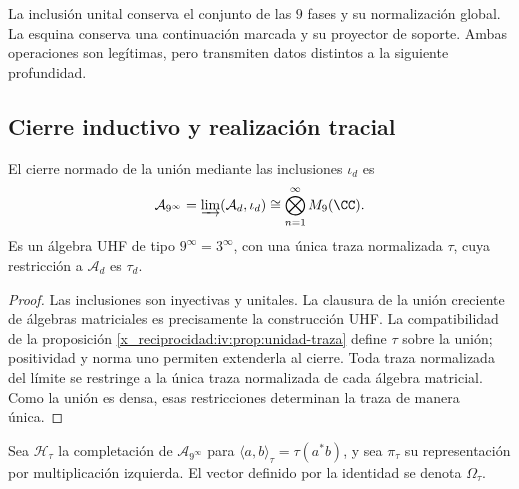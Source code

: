 La inclusión unital conserva el conjunto de las \(9\) fases y su
normalización global. La esquina conserva una continuación marcada y
su proyector de soporte. Ambas operaciones son legítimas, pero
transmiten datos distintos a la siguiente profundidad.

\subsection{Cierre inductivo y realización tracial}

\begin{theorem}
\label{x_reciprocidad:iv:thm:uhf}
El cierre normado de la unión mediante las inclusiones \(\iota_d\)
es
\[
 \mathcal A_{9^\infty}
 =\varinjlim(\mathcal A_d,\iota_d)
 \cong\bigotimes_{n=1}^{\infty}M_9(\CC).
\]
Es un álgebra UHF de tipo \(9^\infty=3^\infty\), con una única
traza normalizada \(\tau\), cuya restricción a \(\mathcal A_d\)
es \(\tau_d\).
\end{theorem}
\begin{proof}
Las inclusiones son inyectivas y unitales. La clausura de la unión
creciente de álgebras matriciales es precisamente la construcción UHF.
La compatibilidad de la proposición \ref{x_reciprocidad:iv:prop:unidad-traza}
define \(\tau\) sobre la unión; positividad y norma uno permiten
extenderla al cierre. Toda traza normalizada del límite se restringe
a la única traza normalizada de cada álgebra matricial. Como la unión
es densa, esas restricciones determinan la traza de manera única.
\end{proof}

Sea \(\mathcal H_\tau\) la completación de
\(\mathcal A_{9^\infty}\) para
\(\langle a,b\rangle_\tau=\tau(a^*b)\), y sea \(\pi_\tau\)
su representación por multiplicación izquierda. El vector definido
por la identidad se denota \(\Omega_\tau\).

